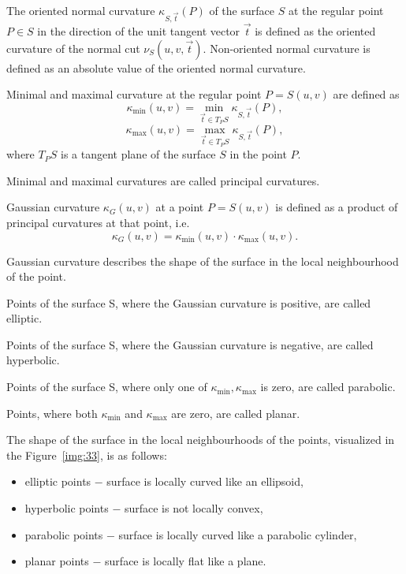 \begin{definition}
    The oriented normal curvature $\kappa_{S, \vec{t}}(P)$ of the surface $S$ at the 
    regular point $P \in S$ in the direction of the unit tangent vector
    $\vec{t}$ is defined as the oriented curvature of the normal cut $\nu_S(u, v, \vec{t})$.
    Non-oriented normal curvature is defined as an absolute value of the oriented normal curvature.
\end{definition}

\begin{definition}
    Minimal and maximal curvature at the regular point $P = S(u,v)$ are defined as
    $$\kappa_{\min}(u,v) = \min_{\vec{t} \in T_PS} \kappa_{S, \vec{t}}(P),$$
    $$\kappa_{\max}(u,v) = \max_{\vec{t} \in T_PS} \kappa_{S, \vec{t}}(P),$$
    where $T_PS$ is a tangent plane of the surface $S$ in the point $P$.

    Minimal and maximal curvatures are called principal curvatures.
\end{definition}

\begin{definition}
    Gaussian curvature $\kappa_G(u, v)$ at a point $P=S(u, v)$ is defined as a product of principal curvatures
    at that point, i.e.
    $$\kappa_G(u, v) = \kappa_{\min}(u,v) \cdot \kappa_{\max}(u,v).$$
\end{definition}

Gaussian curvature describes the shape of the surface in the local neighbourhood of the point.

Points of the surface S, where the Gaussian curvature is positive, are called elliptic.

Points of the surface S, where the Gaussian curvature is negative, are called hyperbolic.

Points of the surface S, where only one of $\kappa_{\min}, \kappa_{\max}$ is zero, are called
parabolic. 

Points, where both $\kappa_{\min}$ and $\kappa_{\max}$ are zero, are called planar.

The shape of the surface in the local neighbourhoods of the points, visualized in the
Figure~\ref{img:33}, is as follows:
\begin{itemize}
    \item {elliptic points $-$ surface is locally curved like an ellipsoid,}
    \item {hyperbolic points $-$ surface is not locally convex,}
    \item {parabolic points $-$ surface is locally curved like a parabolic cylinder,}
    \item {planar points $-$ surface is locally flat like a plane.}
\end{itemize}


